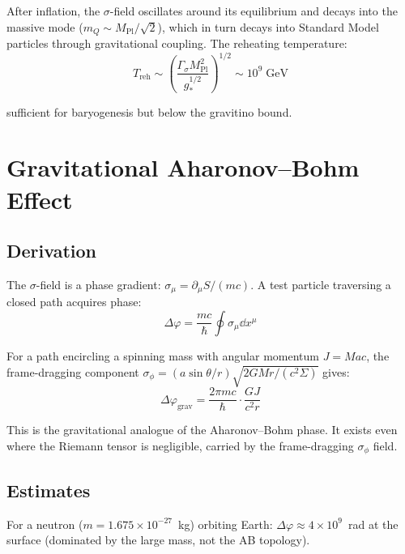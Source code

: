 \documentclass[11pt,a4paper]{article}
\theoremstyle{plain}
\theoremstyle{definition}
\theoremstyle{remark}
\newcommand{\mQ}{m_Q}
\newcommand{\Mpl}{M_{\mathrm{Pl}}}
\begin{document}
After inflation, the $\sigma$-field oscillates around its equilibrium and decays into the massive mode ($\mQ \sim \Mpl/\sqrt{2}$), which in turn decays into Standard Model particles through gravitational coupling.  The reheating temperature:
\begin{equation}
  T_{\mathrm{reh}} \sim \left(\frac{\Gamma_\sigma \Mpl^2}{g_*^{1/2}}\right)^{1/2} \sim 10^{9}\;\mathrm{GeV}
\end{equation}

sufficient for baryogenesis but below the gravitino bound.

\section{Gravitational Aharonov--Bohm Effect}
\label{sec:ab}

\subsection{Derivation}

The $\sigma$-field is a phase gradient: $\sigma_\mu = \partial_\mu S/(mc)$.  A test particle traversing a closed path acquires phase:
\begin{equation}
  \Delta\varphi = \frac{mc}{\hbar}\oint\sigma_\mu\dd x^\mu
\end{equation}

For a path encircling a spinning mass with angular momentum $J = Mac$, the frame-dragging component $\sigma_\phi = (a\sin\theta/r)\sqrt{2GMr/(c^2\Sigma)}$ gives:
\begin{equation}
  \boxed{\Delta\varphi_{\mathrm{grav}} = \frac{2\pi mc}{\hbar}\cdot\frac{GJ}{c^2 r}}
\end{equation}

This is the gravitational analogue of the Aharonov--Bohm phase.  It exists even where the Riemann tensor is negligible, carried by the frame-dragging $\sigma_\phi$ field.

\subsection{Estimates}

For a neutron ($m = 1.675\times10^{-27}$~kg) orbiting Earth: $\Delta\varphi \approx 4\times10^{9}$~rad at the surface (dominated by the large mass, not the AB topology).
\end{document}
